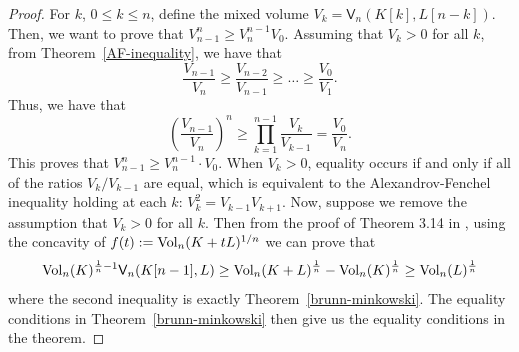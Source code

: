 \documentclass{puthesis-UG}
\begin{document}
\begin{proof}
	For $k$, $0 \leq k \leq n$, define the mixed volume $V_k = \mathsf{V}_n (K[k], L[n-k])$. Then, we want to prove that $V_{n-1}^n \geq V_n^{n-1}V_0$. Assuming that $V_k > 0$ for all $k$, from Theorem~\ref{AF-inequality}, we have that 
	\[
		\frac{V_{n-1}}{V_n} \geq \frac{V_{n-2}}{V_{n-1}} \geq \ldots \geq \frac{V_{0}}{V_1}.
	\]
	Thus, we have that 
	\[	
		\left ( \frac{V_{n-1}}{V_n} \right )^n \geq \prod_{k = 1}^{n-1} \frac{V_k}{V_{k-1}} = \frac{V_0}{V_n}.
	\]
	This proves that $V_{n-1}^n \geq V_n^{n-1} \cdot V_0$. When $V_k > 0$, equality occurs if and only if all of the ratios $V_k / V_{k-1}$ are equal, which is equivalent to the Alexandrov-Fenchel inequality holding at each $k$: $V_k^2 = V_{k-1} V_{k+1}$. Now, suppose we remove the assumption that $V_k > 0$ for all $k$. Then from the proof of Theorem 3.14 in \cite{Hug2020-ue}, using the concavity of $f(t) := \operatorname{Vol}_n (K + t L)^{1/n}$ we can prove that 
	\[
		\operatorname{Vol}_n(K)^{\frac{1}{n} - 1} \mathsf{V}_n (K[n-1], L) \geq \operatorname{Vol}_n(K+L)^{\frac{1}{n}} - \operatorname{Vol}_n(K)^{\frac{1}{n}} \geq \operatorname{Vol}_n(L)^{\frac{1}{n}}
	\]
	where the second inequality is exactly Theorem~\ref{brunn-minkowski}. The equality conditions in Theorem~\ref{brunn-minkowski} then give us the equality conditions in the theorem. 
\end{proof}
\end{document}

